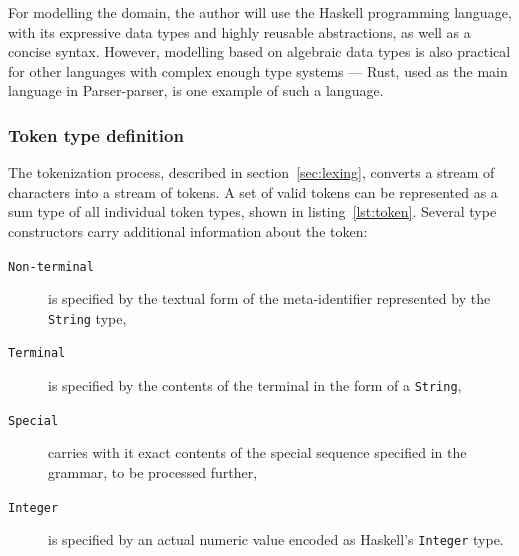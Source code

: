 \documentclass[english,engineering]{wizthesis}
\newcommand{\todo}[1]{%
  \textcolor{red}{[\textbf{TODO}\ifx&#1&{}\else{ }\fi\emph{#1}]}%
}
\newcommand{\thisproject}{Parser-parser}
\begin{document}
For modelling the domain, the author will use the Haskell programming language,
with its expressive data types and highly reusable abstractions, as well as a
concise syntax. However, modelling based on algebraic data types is also
practical for other languages with complex enough type systems --- Rust, used as
the main language in \thisproject{}, is one example of such a language.

\subsubsection*{Token type definition}

The tokenization process, described in section~\ref{sec:lexing}, converts a
stream of characters into a stream of tokens. A set of valid tokens can be
represented as a sum type of all individual token types, shown in
listing~\ref{lst:token}. Several type constructors carry additional information
about the token:
\begin{description}
  \item[\texttt{Non-terminal}] is specified by the textual form of the
  meta-identifier represented by the \texttt{String} type,
  \item[\texttt{Terminal}] is specified by the contents of the terminal in the
  form of a \texttt{String},
  \item[\texttt{Special}] carries with it exact contents of the special
  sequence specified in the grammar, to be processed further,
  \item[\texttt{Integer}] is specified by an actual numeric value encoded as
  Haskell's \texttt{Integer} type.
\end{description}





\end{document}
